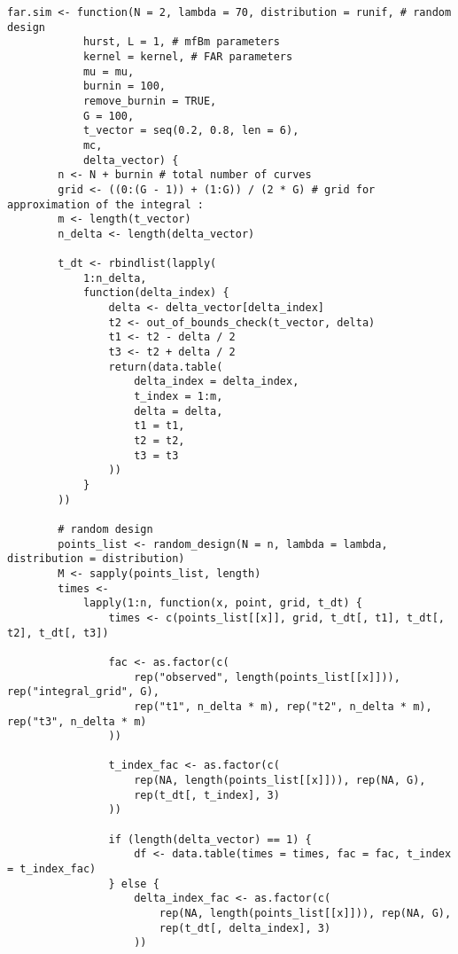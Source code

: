 	\begin{verbatim}
far.sim <- function(N = 2, lambda = 70, distribution = runif, # random design
            hurst, L = 1, # mfBm parameters
            kernel = kernel, # FAR parameters
            mu = mu,
            burnin = 100,
            remove_burnin = TRUE,
            G = 100,
            t_vector = seq(0.2, 0.8, len = 6),
            mc,
            delta_vector) {
        n <- N + burnin # total number of curves
        grid <- ((0:(G - 1)) + (1:G)) / (2 * G) # grid for approximation of the integral :
        m <- length(t_vector)
        n_delta <- length(delta_vector)

        t_dt <- rbindlist(lapply(
            1:n_delta,
            function(delta_index) {
                delta <- delta_vector[delta_index]
                t2 <- out_of_bounds_check(t_vector, delta)
                t1 <- t2 - delta / 2
                t3 <- t2 + delta / 2
                return(data.table(
                    delta_index = delta_index,
                    t_index = 1:m,
                    delta = delta,
                    t1 = t1,
                    t2 = t2,
                    t3 = t3
                ))
            }
        ))

        # random design
        points_list <- random_design(N = n, lambda = lambda, distribution = distribution)
        M <- sapply(points_list, length)
        times <-
            lapply(1:n, function(x, point, grid, t_dt) {
                times <- c(points_list[[x]], grid, t_dt[, t1], t_dt[, t2], t_dt[, t3])

                fac <- as.factor(c(
                    rep("observed", length(points_list[[x]])), rep("integral_grid", G),
                    rep("t1", n_delta * m), rep("t2", n_delta * m), rep("t3", n_delta * m)
                ))

                t_index_fac <- as.factor(c(
                    rep(NA, length(points_list[[x]])), rep(NA, G),
                    rep(t_dt[, t_index], 3)
                ))

                if (length(delta_vector) == 1) {
                    df <- data.table(times = times, fac = fac, t_index = t_index_fac)
                } else {
                    delta_index_fac <- as.factor(c(
                        rep(NA, length(points_list[[x]])), rep(NA, G),
                        rep(t_dt[, delta_index], 3)
                    ))


\end{verbatim}
